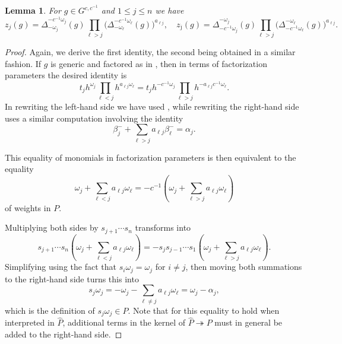 \documentclass[12pt]{amsart}
\newcommand\onto{\twoheadrightarrow}
\newcommand{\ol}[1]{\overline{#1}}
\newcommand{\cvar}{z}
\newtheorem{lemma}[theorem]{Lemma}
\theoremstyle{remark}
\numberwithin{equation}{section}
\numberwithin{figure}{section}
\begin{document}
\begin{lemma}
  \label{lemma:coefficients_identities}
  For $g \in G^{c,c^{-1}}$ and $1 \leq j \leq n$ we have
  \begin{equation*}
    \cvar_j(g) 
    =
    \Delta_{-\omega_j}^{-c^{-1}\omega_j}(g)
    \prod_{\ell>j}\Big(\Delta_{-\omega_\ell}^{-c^{-1}\omega_\ell}(g)\Big)^{a_{\ell j}},
    \quad
    \cvar_{\ol{\jmath}}(g) 
    = 
    \Delta_{-c^{-1}\omega_j}^{-\omega_j}(g)
    \prod_{\ell>j}\Big(\Delta_{-c^{-1}\omega_\ell}^{-\omega_\ell}(g)\Big)^{a_{\ell j}}.
  \end{equation*}
\end{lemma}
\begin{proof}
  Again, we derive the first identity, the second being obtained in a similar fashion.
  If $g$ is generic and factored as in , then in terms of factorization parameters the desired identity is
  \begin{equation}
    t_j  h^{\omega_j} \prod_{\ell<j}h^{a_{\ell j}\omega_\ell} 
    = 
    t_j  h^{-c^{-1}\omega_j} \prod_{\ell>j}h^{-a_{\ell j}c^{-1}\omega_\ell}.
  \end{equation}
  In rewriting the left-hand side we have used , while rewriting the right-hand side uses a similar computation involving the identity
  \[
    \beta_j^-+\sum_{\ell>j}a_{\ell j}\beta_\ell^-
    =
    \alpha_j.
  \]

  This equality of monomials in factorization parameters is then equivalent to the equality
  \begin{equation}
    \label{eq:c_inverse_equality}
    \omega_j + \sum_{\ell<j} a_{\ell j}\omega_\ell
    =
    -c^{-1}\left(\omega_j + \sum_{\ell>j} a_{\ell j}\omega_\ell\right)
  \end{equation}
  of weights in $P$.
  
  Multiplying both sides by $s_{j+1}\cdots s_n$ transforms  into
  \[
    s_{j+1}\cdots s_n\left(\omega_j + \sum_{\ell<j} a_{\ell j}\omega_\ell\right)
    =
    -s_js_{j-1}\cdots s_1\left(\omega_j + \sum_{\ell>j} a_{\ell j}\omega_\ell\right).
  \]
  Simplifying using the fact that $s_i\omega_j=\omega_j$ for $i\neq j$, then moving both summations to the right-hand side turns this into
  \begin{equation}
    s_j\omega_j
    =
    -\omega_j-\sum_{\ell\neq j}a_{\ell j}\omega_\ell
    =
    \omega_j-\alpha_j,
  \end{equation}
  which is the definition of $s_j\omega_j \in P$.
  Note that for this equality to hold when interpreted in $\widehat{P}$, additional terms in the kernel of $\widehat{P} \onto P$ must in general be added to the right-hand side.
\end{proof}
\end{document}
